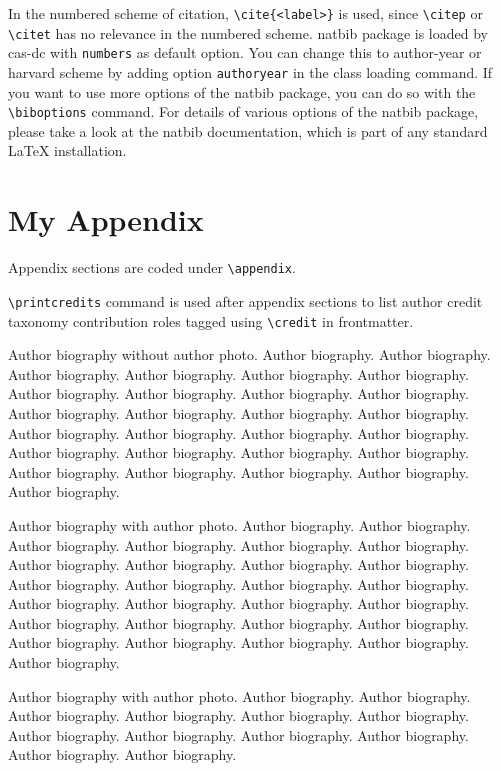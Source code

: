 \documentclass[a4paper,fleqn]{cas-dc}
\begin{document}
In the numbered scheme of citation, \verb+\cite{<label>}+ is used,
since \verb+\citep+ or \verb+\citet+ has no relevance in the numbered
scheme.  {natbib} package is loaded by {cas-dc} with
\verb+numbers+ as default option.  You can change this to author-year
or harvard scheme by adding option \verb+authoryear+ in the class
loading command.  If you want to use more options of the {natbib}
package, you can do so with the \verb+\biboptions+ command.  For
details of various options of the {natbib} package, please take a
look at the {natbib} documentation, which is part of any standard
\LaTeX{} installation.

\appendix
\section{My Appendix}
Appendix sections are coded under \verb+\appendix+.

\verb+\printcredits+ command is used after appendix sections to list 
author credit taxonomy contribution roles tagged using \verb+\credit+ 
in frontmatter.

\printcredits

%






\bio{}
Author biography without author photo.
Author biography. Author biography. Author biography.
Author biography. Author biography. Author biography.
Author biography. Author biography. Author biography.
Author biography. Author biography. Author biography.
Author biography. Author biography. Author biography.
Author biography. Author biography. Author biography.
Author biography. Author biography. Author biography.
Author biography. Author biography. Author biography.
Author biography. Author biography. Author biography.
\endbio

Author biography with author photo.
Author biography. Author biography. Author biography.
Author biography. Author biography. Author biography.
Author biography. Author biography. Author biography.
Author biography. Author biography. Author biography.
Author biography. Author biography. Author biography.
Author biography. Author biography. Author biography.
Author biography. Author biography. Author biography.
Author biography. Author biography. Author biography.
Author biography. Author biography. Author biography.
\endbio

Author biography with author photo.
Author biography. Author biography. Author biography.
Author biography. Author biography. Author biography.
Author biography. Author biography. Author biography.
Author biography. Author biography. Author biography.
\endbio
\end{document}
